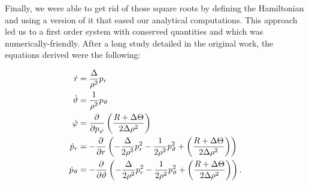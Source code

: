Finally, we were able to get rid of those square roots by defining the Hamiltonian and using a version of it that eased our analytical computations. This approach led us to a first order system with conserved quantities and which was numerically-friendly. After a long study detailed in the original work, the equations derived were the following:

\begin{theorem}
	\label{theo:eqsmotion}
	\begin{align}
	\dot{r} &= \frac{\Delta}{\rho^2} p_r \\
	\dot{\vartheta} &= \frac{1}{\rho^2}p_\vartheta \\ \label{eq:eqsmotionp}
	\dot{\varphi} &= \frac{\partial^{} }{\partial p_\varphi}\left( \frac{R + \Delta\Theta}{2\Delta\rho^2} \right) \\ \label{eq:eqsmotionpr}
	\dot{p}_r &= - \frac{\partial^{} }{\partial r} \left( - \frac{\Delta}{2\rho^2}p_r^2 - \frac{1}{2\rho^2}p_\vartheta^2 + \left( \frac{R + \Delta\Theta}{2\Delta\rho^2} \right) \right) \\ \label{eq:eqsmotionpt}
	\dot{p}_\vartheta &= - \frac{\partial^{} }{\partial \vartheta} \left( - \frac{\Delta}{2\rho^2}p_r^2 - \frac{1}{2\rho^2}p_\vartheta^2 + \left( \frac{R + \Delta\Theta}{2\Delta\rho^2} \right) \right).
	\end{align}
\end{theorem}